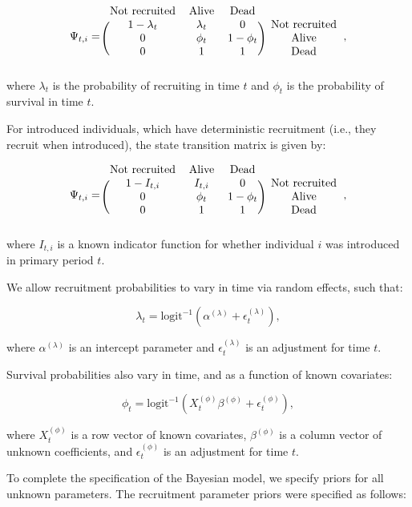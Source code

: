 \documentclass[9pt,twoside,lineno]{pnas-new}
\begin{document}
\[
\Psi_{t, i} =
\begin{blockarray}{cccc}
  \text{Not recruited} & \text{Alive} & \text{Dead} \\
\begin{block}{(ccc)c}
  1 - \lambda_t & \lambda_t & 0 & \text{Not recruited} \\
  0 & \phi_t & 1 - \phi_t & \text{Alive} \\
  0 & 1 & 1 & \text{Dead} \\
\end{block}
\end{blockarray},
\] where \(\lambda_t\) is the probability of recruiting in time \(t\)
and \(\phi_t\) is the probability of survival in time \(t\).

For introduced individuals, which have deterministic recruitment (i.e.,
they recruit when introduced), the state transition matrix is given by:

\[
\Psi_{t, i} =
\begin{blockarray}{cccc}
  \text{Not recruited} & \text{Alive} & \text{Dead} \\
\begin{block}{(ccc)c}
  1 - I_{t, i} & I_{t, i} & 0 & \text{Not recruited} \\
  0 & \phi_t & 1 - \phi_t & \text{Alive} \\
  0 & 1 & 1 & \text{Dead} \\
\end{block}
\end{blockarray},
\] where \(I_{t, i}\) is a known indicator function for whether
individual \(i\) was introduced in primary period \(t\).

We allow recruitment probabilities to vary in time via random effects,
such that:

\[\lambda_t = \text{logit}^{-1}(\alpha^{(\lambda)} + \epsilon^{(\lambda)}_t),\]

where \(\alpha^{(\lambda)}\) is an intercept parameter and
\(\epsilon^{(\lambda)}_t\) is an adjustment for time \(t\).

Survival probabilities also vary in time, and as a function of known
covariates:

\[\phi_t = \text{logit}^{-1}(X^{(\phi)}_t \beta^{(\phi)} + \epsilon^{(\phi)}_t),\]

where \(X^{(\phi)}_t\) is a row vector of known covariates,
\(\beta^{(\phi)}\) is a column vector of unknown coefficients, and
\(\epsilon^{(\phi)}_t\) is an adjustment for time \(t\).

To complete the specification of the Bayesian model, we specify priors
for all unknown parameters. The recruitment parameter priors were
specified as follows:
\end{document}
